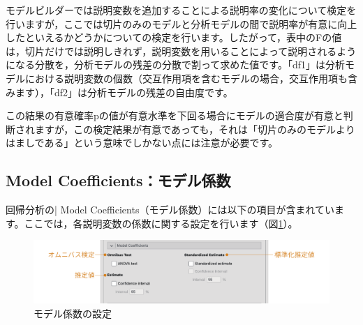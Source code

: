 \documentclass[
  12pt,
  a5jpaper,
  lualatex, ja=standard]{bxjsbook}
\begin{document}
モデルビルダーでは説明変数を追加することによる説明率の変化について検定を行いますが，ここでは切片のみのモデルと分析モデルの間で説明率が有意に向上したといえるかどうかについての検定を行います。したがって，表中のFの値は，切片だけでは説明しきれず，説明変数を用いることによって説明されるようになる分散を，分析モデルの残差の分散で割って求めた値です。「df1」は分析モデルにおける説明変数の個数（交互作用項を含むモデルの場合，交互作用項も含みます），「df2」は分析モデルの残差の自由度です。

この結果の有意確率pの値が有意水準を下回る場合にモデルの適合度が有意と判断されますが，この検定結果が有意であっても，それは「切片のみのモデルよりはましである」という意味でしかない点には注意が必要です。

\hypertarget{sub:regression-LR-modelcoeff}{%
\subsection{Model Coefficients：モデル係数}\label{sub:regression-LR-modelcoeff}}

回帰分析の\colorbox{bar}{\textcolor{gmoji2}{| Model Coefficients}}（モデル係数）には以下の項目が含まれています。ここでは，各説明変数の係数に関する設定を行います（図\ref{fig:regression-lr-model-coeff}）。

\begin{figure}[!ht]

{\centering \includegraphics[width=1\linewidth]{images/regression/lr-model-coeff} 

}

\caption{モデル係数の設定}\label{fig:regression-lr-model-coeff}
\end{figure}
\end{document}
